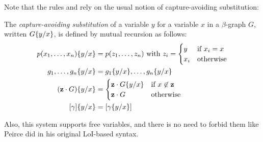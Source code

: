 Note that the rules  and  rely on the usual notion
of capture-avoiding substitution:

\begin{definition}
  The \emph{capture-avoiding substitution} of a variable $y$ for a variable $x$
  in a $\beta$-graph $G$, written $G \{ y / x \}$, is defined by mutual
  recursion as follows:
  \begin{align*}
    \subst{p(x_1,\ldots,x_n)}{y}{x} &= p(z_1, \ldots, z_n) \text{ with } z_i = \begin{cases}
      y &\text{if $x_i = x$} \\
      x_i &\text{otherwise}
    \end{cases} \\
    \subst{g_1, \ldots, g_n}{y}{x} &= \subst{g_1}{y}{x}, \ldots, \subst{g_n}{y}{x} \\
    \subst{(\garden{\mathbf{z}}{G})}{y}{x} &= \begin{cases}
      \garden{\mathbf{z}}{\subst{G}{y}{x}} &\text{if $x \not\in \mathbf{z}$} \\
      \garden{\mathbf{z}}{G} &\text{otherwise}
    \end{cases} \\
    \subst{[\gamma]}{y}{x} &= [\subst{\gamma}{y}{x}]
  \end{align*}
\end{definition}

Also, this system supports free variables, and there is no need to forbid them
like Peirce did in his original LoI-based syntax.